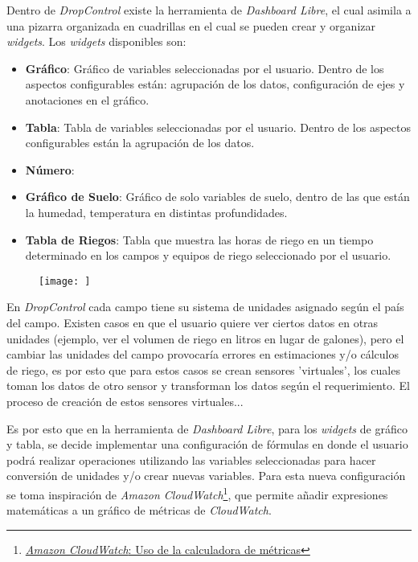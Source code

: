 
Dentro de \textit{DropControl} existe la herramienta de \textit{Dashboard Libre}, el cual asimila a una pizarra organizada en cuadrillas en el cual se pueden crear y organizar \textit{widgets}.
Los \textit{widgets} disponibles son:
\begin{itemize}
    \item \textbf{Gráfico}: Gráfico de variables seleccionadas por el usuario. Dentro de los aspectos configurables están: agrupación de los datos, configuración de ejes y anotaciones en el gráfico.
    \item \textbf{Tabla}: Tabla de variables seleccionadas por el usuario. Dentro de los aspectos configurables están la agrupación de los datos.
    \item \textbf{Número}:
    \item \textbf{Gráfico de Suelo}: Gráfico de solo variables de suelo, dentro de las que están la humedad, temperatura en distintas profundidades.
    \item \textbf{Tabla de Riegos}: Tabla que muestra las horas de riego en un tiempo determinado en los campos y equipos de riego seleccionado por el usuario.
\end{itemize}
\iffalse Agregar imagen de ejemplo de un dashboard y sus widgets \fi
\begin{figure}[H]
    \centering
	\texttt{[image: ]}
	\caption{}
\end{figure}

En \textit{DropControl} cada campo tiene su sistema de unidades asignado según el país del campo. Existen casos en que el usuario quiere ver ciertos datos en otras unidades (ejemplo, ver el volumen de riego en litros en lugar de galones), pero el cambiar las unidades del campo provocaría errores en estimaciones y/o cálculos de riego, es por esto que para estos casos se crean sensores 'virtuales', los cuales toman los datos de otro sensor y transforman los datos según el requerimiento.
El proceso de creación de estos sensores virtuales...

Es por esto que en la herramienta de \textit{Dashboard Libre}, para los \textit{widgets} de gráfico y tabla, se decide implementar una configuración de fórmulas en donde el usuario podrá realizar operaciones utilizando las variables seleccionadas para hacer conversión de unidades y/o crear nuevas variables.
Para esta nueva configuración se toma inspiración de \textit{Amazon CloudWatch}\footnote{\href{https://docs.aws.amazon.com/es_es/AmazonCloudWatch/latest/monitoring/using-metric-math.html}{\textit{Amazon CloudWatch}: Uso de la calculadora de métricas}}, que permite añadir expresiones matemáticas a un gráfico de métricas de \textit{CloudWatch}.


